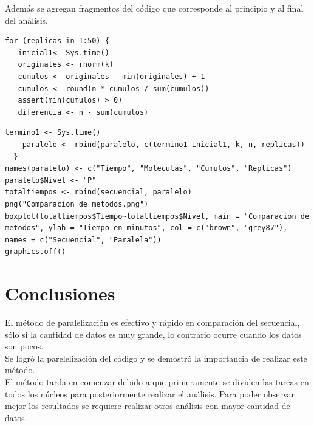 \documentclass{article}
\begin{document}
\vspace{40mm}
Además se agregan fragmentos del código que corresponde al principio y al final  del análisis.
\begin{lstlisting}[frame=single]
for (replicas in 1:50) {
   inicial1<- Sys.time()
   originales <- rnorm(k)
   cumulos <- originales - min(originales) + 1
   cumulos <- round(n * cumulos / sum(cumulos))
   assert(min(cumulos) > 0)
   diferencia <- n - sum(cumulos)
\end{lstlisting}
\begin{lstlisting}[frame=single]
termino1 <- Sys.time()
    paralelo <- rbind(paralelo, c(termino1-inicial1, k, n, replicas))
  }
names(paralelo) <- c("Tiempo", "Moleculas", "Cumulos", "Replicas")
paralelo$Nivel <- "P"
totaltiempos <- rbind(secuencial, paralelo)
png("Comparacion de metodos.png")
boxplot(totaltiempos$Tiempo~totaltiempos$Nivel, main = "Comparacion de metodos", ylab = "Tiempo en minutos", col = c("brown", "grey87"), names = c("Secuencial", "Paralela"))
graphics.off()
\end{lstlisting}

\section{Conclusiones}
El método de paralelización es efectivo y rápido en comparación del secuencial, sólo si la cantidad de datos es muy grande, lo contrario ocurre cuando los datos son pocos.\\
Se logró la parelelización del código y se demostró la importancia de realizar este método.\\
El método tarda en comenzar debido a que primeramente se dividen las tareas en todos los núcleos para posteriormente realizar el análisis.
Para poder observar mejor los resultados se requiere realizar otros análisis con mayor cantidad de datos.



\end{document}

